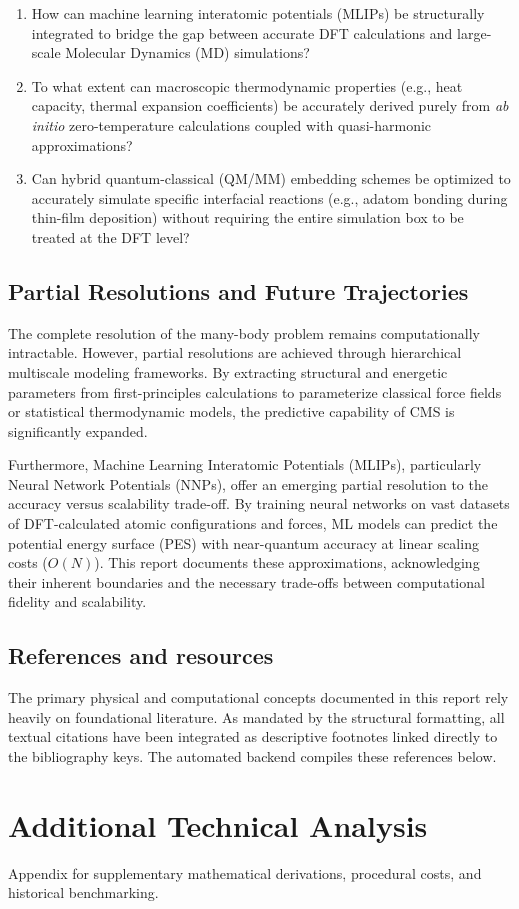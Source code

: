 \documentclass[10pt,a4paper]{article}
\begin{document}
\begin{enumerate}
    \item How can machine learning interatomic potentials (MLIPs) be structurally integrated to bridge the gap between accurate DFT calculations and large-scale Molecular Dynamics (MD) simulations?
    \item To what extent can macroscopic thermodynamic properties (e.g., heat capacity, thermal expansion coefficients) be accurately derived purely from \textit{ab initio} zero-temperature calculations coupled with quasi-harmonic approximations?
    \item Can hybrid quantum-classical (QM/MM) embedding schemes be optimized to accurately simulate specific interfacial reactions (e.g., adatom bonding during thin-film deposition) without requiring the entire simulation box to be treated at the DFT level?
\end{enumerate}

\subsection{Partial Resolutions and Future Trajectories}

The complete resolution of the many-body problem remains computationally intractable. However, partial resolutions are achieved through hierarchical multiscale modeling frameworks. By extracting structural and energetic parameters from first-principles calculations to parameterize classical force fields or statistical thermodynamic models, the predictive capability of CMS is significantly expanded. 

Furthermore, Machine Learning Interatomic Potentials (MLIPs), particularly Neural Network Potentials (NNPs), offer an emerging partial resolution to the accuracy versus scalability trade-off. By training neural networks on vast datasets of DFT-calculated atomic configurations and forces, ML models can predict the potential energy surface (PES) with near-quantum accuracy at linear scaling costs ($O(N)$). This report documents these approximations, acknowledging their inherent boundaries and the necessary trade-offs between computational fidelity and scalability.

\subsection{References and resources}

The primary physical and computational concepts documented in this report rely heavily on foundational literature. As mandated by the structural formatting, all textual citations have been integrated as descriptive footnotes linked directly to the bibliography keys. The automated backend compiles these references below.

\clearpage

\appendix

\section{Additional Technical Analysis}

Appendix for supplementary mathematical derivations, procedural costs, and historical benchmarking. 

\medskip

\printbibliography %
\end{document}
